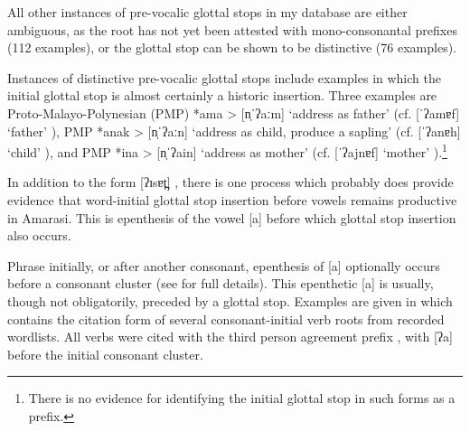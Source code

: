 All other instances of pre-vocalic glottal stops in my database
are either ambiguous, as the root has not yet been attested
with mono-consonantal prefixes (112 examples),
or the glottal stop can be shown to be distinctive (76 examples).

Instances of distinctive pre-vocalic glottal stops include
examples in which the initial glottal stop is almost certainly a historic insertion.
Three examples are Proto-Malayo-Polynesian (PMP) *ama >  {\ra}  [n̩ˈʔaːm] {}
`address as father' (cf.  [ˈʔamɐf] `father' {}),
PMP *anak >  {\ra}  [n̩ˈʔaːn] {} `address as child, produce a sapling'
(cf.  [ˈʔanɐh] `child' {}),
and PMP *ina >  {\ra}  [n̩ˈʔain] {} `address as mother'
(cf.   [ˈʔajnɐf] `mother'  {}).\footnote{
		There is no evidence for identifying the initial glottal stop in such forms as a prefix.}

In addition to the form  [ʔɪsɐt̪] {},
there is one process which probably does provide evidence that word-initial glottal
stop insertion before vowels remains productive in Amarasi.
This is epenthesis of the vowel [a]
before which glottal stop insertion also occurs.

Phrase initially, or after another consonant,
epenthesis of [a] optionally occurs before a
consonant cluster (see  for full details).
This epenthetic [a] is usually, though not obligatorily,
preceded by a glottal stop.
Examples are given in  which contains
the citation form of several consonant-initial verb roots from recorded wordlists.
All verbs were cited with the third person agreement prefix ,
with [ʔa] before the initial consonant cluster.

